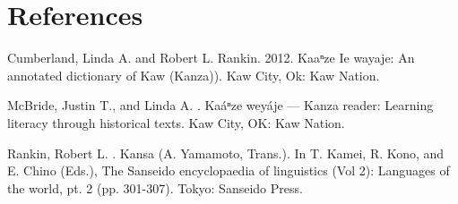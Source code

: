 \documentclass[output=paper]{LSP/langsci}
\begin{document}
\section*{References}

\printbibliography 

\begin{reflist}

Cumberland, Linda A. and Robert L. Rankin. 2012. Kaaⁿze Ie wayaje: An annotated dictionary of Kaw (Kanza)). Kaw City, Ok: Kaw Nation.

McBride, Justin T., and Linda A. \citet{Cumberland2010}. Ka\'aⁿze wey\'aje --- Kanza reader: Learning literacy through historical texts. Kaw City, OK: Kaw Nation.

Rankin, Robert L. . Kansa (A. Yamamoto, Trans.). In T. Kamei, R. Kono, and E. Chino (Eds.), The Sanseido encyclopaedia of linguistics (Vol 2): Languages of the world, pt. 2 (pp. 301-307). Tokyo: Sanseido Press.
\end{reflist}
\end{document}
